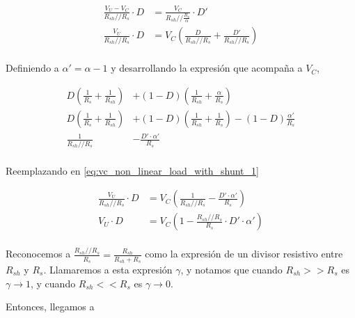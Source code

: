 \begin{equation}
    \label{eq:vc_non_linear_load_with_shunt_1}
    \begin{aligned}
        \frac{V_U-V_C}{R_{sh} // R_{s}} \cdot D &= \frac{V_C}{R_{sh} //
        \frac{R_{s}}{\alpha}} \cdot D'  \\
        \frac{V_U}{R_{sh} // R_{s}} \cdot D &= V_C \left( \frac{D}{R_{sh}
        // R_{s}} + \frac{D'}{R_{sh} // R_{s}} \right) \\
    \end{aligned}
\end{equation}

Definiendo a $\alpha'=\alpha-1$ y desarrollando la expresión que acompaña a $V_C$,

\begin{equation}
    \begin{aligned}
        D \left( \frac{1}{R_s} + \frac{1}{R_{sh}} \right) &+ (1-D) \left(
        \frac{1}{R_{sh}} + \frac{\alpha}{R_s} \right) \\
        D \left( \frac{1}{R_s} + \frac{1}{R_{sh}} \right) &+ (1-D) \left(
        \frac{1}{R_{sh}} + \frac{1}{R_s} \right) - (1-D) \frac{\alpha'}{R_s} \\
        \frac{1}{R_{sh} // R_{s}} &- \frac{D' \cdot \alpha'}{R_s} \\
    \end{aligned}
\end{equation}

Reemplazando en \ref{eq:vc_non_linear_load_with_shunt_1}

\begin{equation}
    \label{eq:vc_non_linear_load_with_shunt_2}
    \begin{aligned}
        \frac{V_U}{R_{sh} // R_{s}} \cdot D &= V_C \left( \frac{1}{R_{sh} //
        R_{s}} - \frac{D' \cdot \alpha'}{R_s} \right) \\
        V_U \cdot D &= V_C \left( 1 - \frac{R_{sh} // R_{s}}{R_s} \cdot D' \cdot
        \alpha'\right) \\
    \end{aligned}
\end{equation}

Reconocemos a $\frac{R_{sh} // R_{s}}{R_s} = \frac{R_{sh}}{R_{sh}+R_s}$ como la
expresión de un divisor resistivo entre $R_{sh}$ y $R_s$. Llamaremos a esta
expresión $\gamma$, y notamos que cuando $R_{sh} >> R_s$ es $\gamma \to 1$, y
cuando $R_{sh} << R_s$ es $\gamma \to 0$.

Entonces, llegamos a

